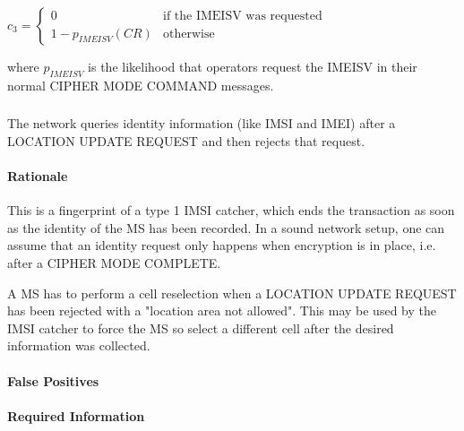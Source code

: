 \documentclass[a4paper,11pt,notitlepage,bigheadings,oneside]{scrartcl}
\begin{document}
$c_3 =
\begin{cases}
	0 		                & \text{if the IMEISV was requested} \\
	1 - p_{IMEISV} (CR)	& \text{otherwise}
\end{cases}$

where $p_{IMEISV}$ is the likelihood that operators request the IMEISV in their
normal CIPHER MODE COMMAND messages.


\subsubsection{}

The network queries identity information (like IMSI and IMEI) after a LOCATION
UPDATE REQUEST and then rejects that request.

\paragraph{Rationale}

This is a fingerprint of a type 1 IMSI catcher, which ends the transaction as
soon as the identity of the MS has been recorded. In a sound network setup, one
can assume that an identity request only happens when encryption is in place,
i.e. after a CIPHER MODE COMPLETE.

A MS has to perform a cell reselection when a LOCATION UPDATE REQUEST has been
rejected with a "location area not allowed". This may be used by the IMSI
catcher to force the MS so select a different cell after the desired
information was collected.


\paragraph{False Positives}


\paragraph{Required Information}
\end{document}
